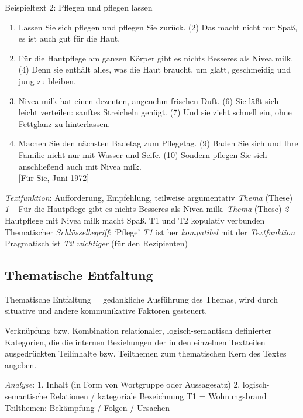\documentclass[
  letterpaper,
]{scrbook}
\providecommand{\tightlist}{%
  \setlength{\itemsep}{0pt}\setlength{\parskip}{0pt}}\usepackage{longtable,booktabs,array}
\begin{document}
Beispieltext 2: Pflegen und pflegen lassen\\

\begin{enumerate}
\def\labelenumi{(\arabic{enumi})}
\tightlist
\item
  Lassen Sie sich pflegen und pflegen Sie zurück. (2) Das macht nicht
  nur Spaß, es ist auch gut für die Haut.\\
\item
  Für die Hautpflege am ganzen Körper gibt es nichts Besseres als Nivea
  milk. (4) Denn sie enthält alles, was die Haut braucht, um glatt,
  geschmeidig und jung zu bleiben.\\
\item
  Nivea milk hat einen dezenten, angenehm frischen Duft. (6) Sie läßt
  sich leicht verteilen: sanftes Streicheln genügt. (7) Und sie zieht
  schnell ein, ohne Fettglanz zu hinterlassen.\\
\item
  Machen Sie den nächsten Badetag zum Pflegetag. (9) Baden Sie sich und
  Ihre Familie nicht nur mit Wasser und Seife. (10) Sondern pflegen Sie
  sich anschließend auch mit Nivea milk.\\
  {[}Für Sie, Juni 1972{]}
\end{enumerate}

\emph{Textfunktion}: Aufforderung, Empfehlung, teilweise argumentativ
\emph{Thema} (These) \emph{1} -- Für die Hautpflege gibt es nichts
Besseres als Nivea milk. \emph{Thema} (These) \emph{2} -- Hautpflege mit
Nivea milk macht Spaß. T1 und T2 kopulativ verbunden Thematischer
\emph{Schlüsselbegriff}: `Pflege' \emph{T1} ist her \emph{kompatibel}
mit der \emph{Textfunktion} Pragmatisch ist \emph{T2 wichtiger} (für den
Rezipienten)

\hypertarget{thematische-entfaltung}{%
\subsection{Thematische Entfaltung}\label{thematische-entfaltung}}

Thematische Entfaltung = gedankliche Ausführung des Themas, wird durch
situative und andere kommunikative Faktoren gesteuert.

Verknüpfung bzw. Kombination relationaler, logisch-semantisch
definierter Kategorien, die die internen Beziehungen der in den
einzelnen Textteilen ausgedrückten Teilinhalte bzw. Teilthemen zum
thematischen Kern des Textes angeben.

\emph{Analyse}: 1. Inhalt (in Form von Wortgruppe oder Aussagesatz) 2.
logisch-semantische Relationen / kategoriale Bezeichnung T1 =
Wohnungsbrand Teilthemen: Bekämpfung / Folgen / Ursachen
\end{document}
